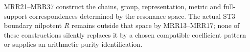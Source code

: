 MRR21--MRR37 construct the chains, group, representation,
metric and full-support correspondences determined by
the resonance space. The actual ST3 boundary nilpotent
$R$ remains outside that space by MRR13--MRR17; none of
these constructions silently replaces it by a chosen
compatible coefficient pattern or supplies an arithmetic
purity identification.
